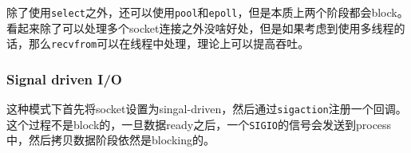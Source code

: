\documentclass[12pt]{article}
\begin{document}
\begin{Shaded}
\begin{Highlighting}[]
\OperatorTok{(}\OperatorTok{)\{}
\OperatorTok{(\&}\OperatorTok{);}
     \OperatorTok{(}\OperatorTok{=} \OperatorTok{;}\OperatorTok{\textless{}} \OperatorTok{;}\OperatorTok{++} \OperatorTok{)} \OperatorTok{\{}
\OperatorTok{(}\OperatorTok{[}\OperatorTok{],\&}\OperatorTok{);}
    \OperatorTok{\}}

\OperatorTok{(}\OperatorTok{);}
\OperatorTok{(}\OperatorTok{+}\OperatorTok{,} \OperatorTok{\&}\OperatorTok{,}\OperatorTok{,}\OperatorTok{,}\OperatorTok{);}

    \OperatorTok{(}\OperatorTok{=}\OperatorTok{;}\OperatorTok{\textless{}}\OperatorTok{;}\OperatorTok{++)} \OperatorTok{\{}
         \OperatorTok{(}\OperatorTok{(}\OperatorTok{[}\OperatorTok{],} \OperatorTok{\&}\OperatorTok{))\{}
\OperatorTok{(}\OperatorTok{,}\OperatorTok{,}\OperatorTok{);}
\OperatorTok{(}\OperatorTok{[}\OperatorTok{],}\OperatorTok{,}\OperatorTok{);}
\OperatorTok{(}\OperatorTok{);}
        \OperatorTok{\}}
    \OperatorTok{\}}   
\OperatorTok{\}}
\end{Highlighting}
\end{Shaded}

除了使用\texttt{select}之外，还可以使用\texttt{pool}和\texttt{epoll}，但是本质上两个阶段都会block。看起来除了可以处理多个socket连接之外没啥好处，但是如果考虑到使用多线程的话，那么\texttt{recvfrom}可以在线程中处理，理论上可以提高吞吐。

\subsubsection{Signal driven I/O}\label{signal-driven-io}

这种模式下首先将socket设置为singal-driven，然后通过\texttt{sigaction}注册一个回调。这个过程不是block的，一旦数据ready之后，一个\texttt{SIGIO}的信号会发送到process中，然后拷贝数据阶段依然是blocking的。
\end{document}
